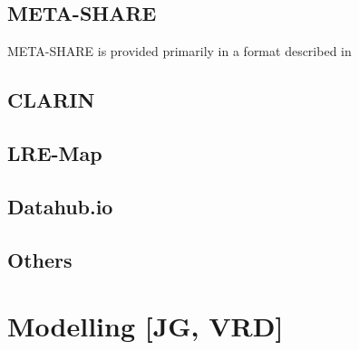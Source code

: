 \documentclass[smallextended]{svjour3}       %
\begin{document}
\begin{table}
    \caption{\label{tab:resource-sizes}The sizes of the resources in terms of
    number of metadata records and total data size}
\end{table}

\subsection{META-SHARE}

META-SHARE is provided primarily in a format described in 

\subsection{CLARIN}

\subsection{LRE-Map}

\subsection{Datahub.io}

\subsection{Others}

\section{Modelling [JG, VRD]}
\label{modelling}
\end{document}
